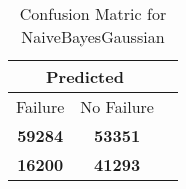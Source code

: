 \begin{table}[] 
\caption{Confusion Matric for NaiveBayesGaussian} 
\label{Table: Prediction Accuracy-DMDNaiveBayesGaussianOnlySunEKF-ignoreReflection100.9EKF-top2-Reflection} 
\centering 
\begin{tabular} 
 {@{}ccc@{}} 
\toprule 
\multicolumn{2}{c}{\textbf{Predicted}}
 \\ \midrule 
\multicolumn{1}{|c|}{Failure} & 
\multicolumn{1}{c|}{No Failure}
 \\ \midrule 
\multicolumn{1}{|c|}{\color{green}\textbf{59284}} & 
\multicolumn{1}{c|}{\color{green}\textbf{53351}}
 \\ \midrule 
\multicolumn{1}{|c|}{\color{red}\textbf{16200}} & 
\multicolumn{1}{c|}{\color{red}\textbf{41293}}
 \\ \bottomrule 
\end{tabular} 
\end{table} 
